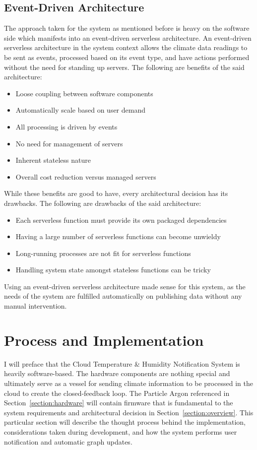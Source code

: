 \documentclass{article}
\begin{document}
\subsection{Event-Driven Architecture}
The approach taken for the system as mentioned before is heavy on the software side which manifests into an event-driven serverless architecture. An event-driven serverless architecture in the system context allows the climate data readings to be sent as events, processed based on its event type, and have actions performed without the need for standing up servers. The following are benefits of the said architecture:

\begin{itemize}
	\item Loose coupling between software components
	\item Automatically scale based on user demand
	\item All processing is driven by events
	\item No need for management of servers
	\item Inherent stateless nature
	\item Overall cost reduction versus managed servers
\end{itemize}

While these benefits are good to have, every architectural decision has its drawbacks. The following  are drawbacks of the said architecture:

\begin{itemize}
	\item Each serverless function must provide its own packaged dependencies
	\item Having a large number of serverless functions can become unwieldy
	\item Long-running processes are not fit for serverless functions
	\item Handling system state amongst stateless functions can be tricky
\end{itemize}

Using an event-driven serverless architecture made sense for this system, as the needs of the system are fulfilled automatically on publishing data without any manual intervention.

\section{Process and Implementation}
I will preface that the Cloud Temperature \& Humidity Notification System is heavily software-based. The hardware components are nothing special and ultimately serve as a vessel for sending climate information to be processed in the cloud to create the closed-feedback loop. The Particle Argon referenced in Section~\ref{section:hardware} will contain firmware that is fundamental to the system requirements and architectural decision in Section~\ref{section:overview}. This particular section will describe the thought process behind the implementation, considerations taken during development, and how the system performs user notification and automatic graph updates.
\end{document}
